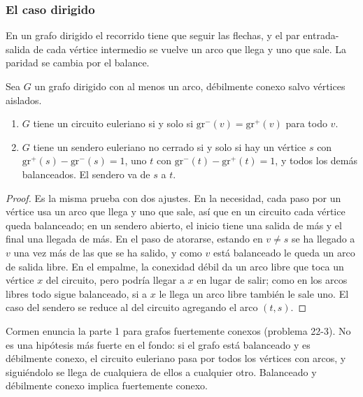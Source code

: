 \documentclass[11pt,letterpaper]{article}
\begin{document}
\subsubsection*{El caso dirigido}

En un grafo dirigido el recorrido tiene que seguir las flechas, y el
par entrada-salida de cada vértice intermedio se vuelve un arco que
llega y uno que sale. La paridad se cambia por el balance.

\begin{teorema}
  \label{teo:euler-dirigido}
  Sea $G$ un grafo dirigido con al menos un arco, débilmente conexo
  salvo vértices aislados.
  \begin{enumerate}[itemsep=0.1em]
    \item $G$ tiene un circuito euleriano si y solo si
          $\text{gr}^{-}(v) = \text{gr}^{+}(v)$ para todo $v$.
    \item $G$ tiene un sendero euleriano no cerrado si y solo si hay un
          vértice $s$ con $\text{gr}^{+}(s) - \text{gr}^{-}(s) = 1$, uno
          $t$ con $\text{gr}^{-}(t) - \text{gr}^{+}(t) = 1$, y todos
          los demás balanceados. El sendero va de $s$ a $t$.
  \end{enumerate}
\end{teorema}

\begin{proof}
  Es la misma prueba con dos ajustes. En la necesidad, cada paso por
  un vértice usa un arco que llega y uno que sale, así que en un
  circuito cada vértice queda balanceado; en un sendero abierto, el
  inicio tiene una salida de más y el final una llegada de más. En el
  paso de atorarse, estando en $v \neq s$ se ha llegado a $v$ una vez
  más de las que se ha salido, y como $v$ está balanceado le queda un
  arco de salida libre. En el empalme, la conexidad débil da un arco
  libre que toca un vértice $x$ del circuito, pero podría llegar a $x$
  en lugar de salir; como en los arcos libres todo sigue balanceado,
  si a $x$ le llega un arco libre también le sale uno. El caso del
  sendero se reduce al del circuito agregando el arco $(t, s)$.
\end{proof}

Cormen enuncia la parte 1 para grafos fuertemente conexos
(problema 22-3). No es una hipótesis más fuerte en el fondo: si el
grafo está balanceado y es débilmente conexo, el circuito euleriano
pasa por todos los vértices con arcos, y siguiéndolo se llega de
cualquiera de ellos a cualquier otro. Balanceado y débilmente conexo
implica fuertemente conexo.
\end{document}
